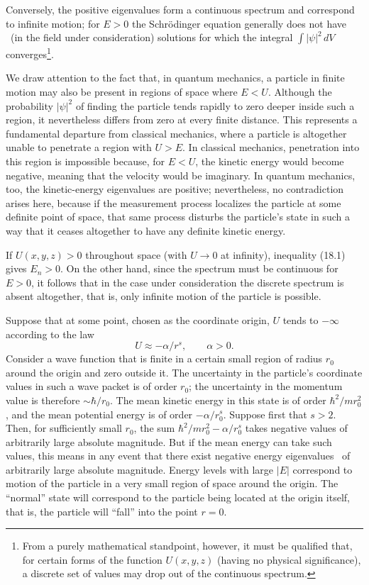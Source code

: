 Conversely, the positive eigenvalues form a continuous spectrum and
correspond to infinite motion; for $E>0$ the Schrödinger equation generally
does not have%
\relax\ (in the field under consideration) solutions for which the integral
$\int|\psi|^2\,dV$ converges\footnote{From a purely mathematical standpoint,
however, it must be qualified that, for certain forms of the function
$U(x,y,z)$ (having no physical significance), a discrete set of values may
drop out of the continuous spectrum.}.

We draw attention to the fact that, in quantum mechanics, a particle in finite
motion may also be present in regions of space where $E<U$. Although the
probability $|\psi|^2$ of finding the particle tends rapidly to zero deeper
inside such a region, it nevertheless differs from zero at every finite
distance. This represents a fundamental departure from classical
mechanics, where a particle is altogether unable to penetrate a region with $U>E$. In
classical mechanics, penetration into this region is impossible because, for
$E<U$, the kinetic energy would become negative, meaning that the velocity
would be imaginary. In quantum mechanics, too, the kinetic-energy eigenvalues are
positive; nevertheless, no contradiction arises here, because if the
measurement process localizes the particle at some definite point of space,
that same process disturbs the particle's state in such a way that it ceases
altogether to have any definite kinetic energy.

If $U(x,y,z)>0$ throughout space (with $U\to0$ at infinity), inequality (18.1)
gives $E_n>0$. On the other hand, since the spectrum must be continuous for
$E>0$, it follows that in the case under consideration the discrete spectrum
is absent altogether, that is, only infinite motion of the particle is
possible.

Suppose that at some point, chosen as the coordinate origin, $U$ tends to
$-\infty$ according to the law
\begin{equation}
  U\approx-\alpha/r^s,
  \qquad \alpha>0.
  \tag{18.2}
\end{equation}
Consider a wave function that is finite in a certain small region of radius
$r_0$ around the origin and zero outside it. The uncertainty in the particle's
coordinate values in such a wave packet is of order $r_0$; the uncertainty in
the momentum value is therefore $\sim\hbar/r_0$. The mean kinetic energy in
this state is of order $\hbar^2/mr_0^2$, and the mean potential energy is of
order $-\alpha/r_0^s$. Suppose first that $s>2$. Then, for sufficiently small
$r_0$, the sum $\hbar^2/mr_0^2-\alpha/r_0^s$ takes negative values of
arbitrarily large absolute magnitude. But if the mean energy can take such
values, this means in any event that there exist negative energy eigenvalues%
\relax\ of arbitrarily large absolute magnitude. Energy levels with large
$|E|$ correspond to motion of the particle
in a very small region of space around the origin. The ``normal'' state will
correspond to the particle being located at the origin itself, that is, the
particle will ``fall'' into the point $r=0$.

